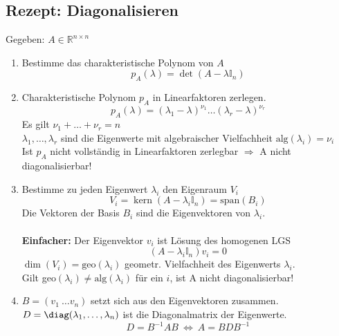 \documentclass[german, 6pt]{latex4ei/latex4ei_sheet}
\DeclareMathOperator{\Kern}{kern}
\begin{document}
\subsection{Rezept: Diagonalisieren}
Gegeben: $A\in \mathbb{R}^{n\times n}$
\begin{enumerate}\itemsep0pt
\item Bestimme das charakteristische Polynom von $A$
\begin{equation*}
p_A(\lambda)=\det(A-\lambda \mathbb{I}_n)
\end{equation*}
\item Charakteristische Polynom $p_A$ in Linearfaktoren zerlegen.
\begin{equation*}
p_A(\lambda)=(\lambda_1-\lambda)^{\nu_1}\dots(\lambda_r-\lambda)^{\nu_r}
\end{equation*}
Es gilt $\nu_1 + \dots + \nu_r=n$ \\
$\lambda_1,\dots, \lambda_r$ sind die Eigenwerte mit algebraischer Vielfachheit $\text{alg}(\lambda_i)=\nu_i$\\
Ist $p_A$ nicht vollständig in Linearfaktoren zerlegbar $\Rightarrow$ A nicht diagonalisierbar!
\item Bestimme zu jeden Eigenwert $\lambda_i$ den Eigenraum $V_i$
\begin{equation*}
V_i=\Kern(A-\lambda_i\mathbb{I}_n)=\text{span}(B_i)
\end{equation*}
Die Vektoren der Basis $B_i$ sind die Eigenvektoren von $\lambda_i$.\\ \\
\textbf{Einfacher:} Der Eigenvektor $v_i$ ist Lösung des homogenen LGS
\begin{equation*}
(A-\lambda_i \mathbb{I}_n)v_i=0
\end{equation*}
$\dim(V_i)=\text{geo}(\lambda_i)$  geometr. Vielfachheit des Eigenwerts $\lambda_i$. \\
Gilt geo$(\lambda_i)\ne\text{alg}(\lambda_i)$ für ein $i$, ist A nicht diagonalisierbar!
\item $B=(v_1 \ \dots v_n)$ setzt sich aus den Eigenvektoren zusammen. \\
$D=\diag(\lambda_1,\dots,\lambda_n)$ ist die Diagonalmatrix der Eigenwerte.
\begin{equation*}
D=B^{-1}AB \ \Leftrightarrow \ A=BDB^{-1}
\end{equation*}
\end{enumerate}
\end{document}

